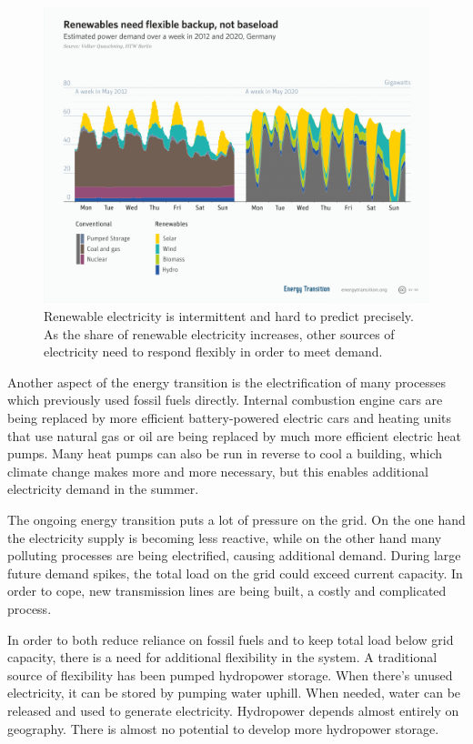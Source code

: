 \begin{figure}
    \centering
    \includegraphics[width = \figurewidth]{figures/flexible_renewables.png}
    \caption{Renewable electricity is intermittent and hard to predict precisely. As the share of renewable electricity increases, other sources of electricity need to respond flexibly in order to meet demand.}
    \label{fig:flexibility}
\end{figure}


Another aspect of the energy transition is the electrification of many processes which previously used fossil fuels directly.
Internal combustion engine cars are being replaced by more efficient battery-powered electric cars and heating units that use natural gas or oil are being replaced by much more efficient electric heat pumps.
Many heat pumps can also be run in reverse to cool a building, which climate change makes more and more necessary, but this enables additional electricity demand in the summer.

The ongoing energy transition puts a lot of pressure on the grid.
On the one hand the electricity supply is becoming less reactive, while on the other hand many polluting processes are being electrified, causing additional demand.
During large future demand spikes, the total load on the grid could exceed current capacity. In order to cope, new transmission lines are being built, a costly and complicated process.

In order to both reduce reliance on fossil fuels and to keep total load below grid capacity, there is a need for additional flexibility in the system.
A traditional source of flexibility has been pumped hydropower storage.
When there's unused electricity, it can be stored by pumping water uphill.
When needed, water can be released and used to generate electricity. 
Hydropower depends almost entirely on geography. There is almost no potential to develop more hydropower storage.


